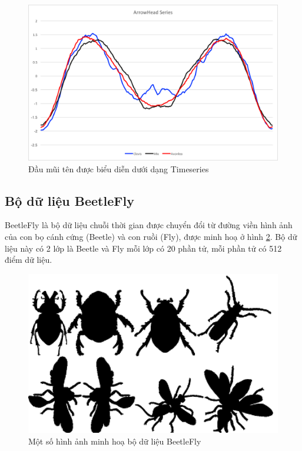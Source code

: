 \documentclass[13pt,oneside]{scrbook}
\begin{document}
\begin{figure}[!htbp]
	\begin{center}
		\includegraphics[width=130mm]{ArrowHead_Graph.png}
		\caption{Đầu mũi tên được biểu diễn dưới dạng Timeseries} 
		\label{ArrowHead_Graph.png}
	\end{center}
\end{figure}
\subsection{Bộ dữ liệu BeetleFly}
BeetleFly là bộ dữ liệu chuỗi thời gian được chuyển đổi từ đường viền hình ảnh của con bọ cánh cứng (Beetle) và con ruồi (Fly), được minh hoạ ở hình \ref{BeetleFly.png}.
Bộ dữ liệu này có 2 lớp là Beetle và Fly mỗi lớp có 20 phần tử, mỗi phần tử có 512 điểm dữ liệu.
\begin{figure}[!htbp]
	\begin{center}
		\includegraphics[width=130mm]{BeetleFly.png}
		\caption{Một số hình ảnh minh hoạ bộ dữ liệu BeetleFly} 
		\label{BeetleFly.png}
	\end{center}
\end{figure}
\end{document}

